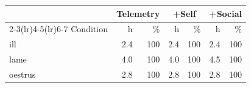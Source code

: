 \begin{tabular}{lrrrrrr}
\toprule
& \multicolumn{2}{c}{Telemetry} & \multicolumn{2}{c}{+Self} & \multicolumn{2}{c}{+Social} \\
\cmidrule(lr){2-3}\cmidrule(lr){4-5}\cmidrule(lr){6-7}
Condition & h & \% & h & \% & h & \% \\
\midrule
ill & 2.4 & 100 & 2.4 & 100 & 2.4 & 100 \\
lame & 4.0 & 100 & 4.0 & 100 & 4.5 & 100 \\
oestrus & 2.8 & 100 & 2.8 & 100 & 2.8 & 100 \\
\bottomrule
\end{tabular}

